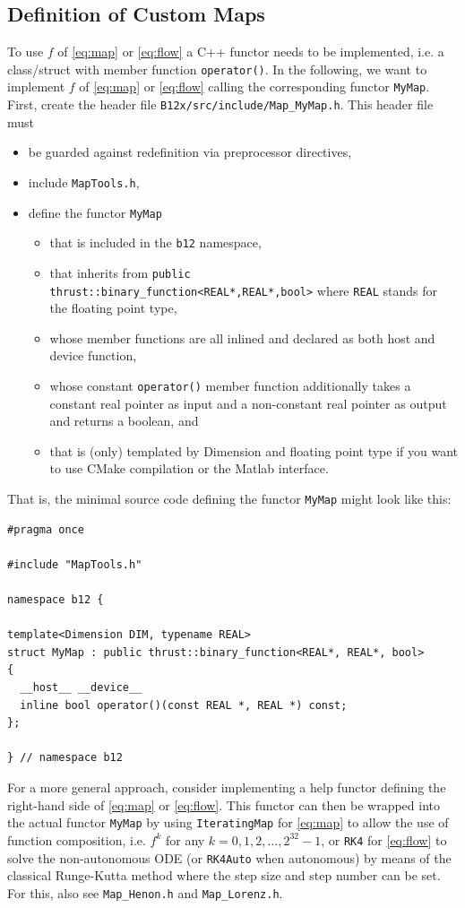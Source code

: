 \documentclass[a4paper,10pt,fleqn]{article}
\begin{document}
\subsection{Definition of Custom Maps} \label{subsec:def_custom_maps}

To use $f$ of \eqref{eq:map} or \eqref{eq:flow} a C++ functor needs to be implemented, i.e. a class/struct with member function \verb$operator()$. In the following, we want to implement $f$ of \eqref{eq:map} or \eqref{eq:flow} calling the corresponding functor \verb$MyMap$.\\
First, create the header file \verb$B12x/src/include/Map_MyMap.h$. This header file must
\begin{itemize}
\item be guarded against redefinition via preprocessor directives,
\item include \verb$MapTools.h$,
\item define the functor \verb$MyMap$
	\begin{itemize}
	\item that is included in the \verb$b12$ namespace,
	\item that inherits from \verb$public thrust::binary_function<REAL*,REAL*,bool>$ where \verb$REAL$ stands for the floating point type,
	\item whose member functions are all inlined and declared as both host and device function,
	\item whose constant \verb$operator()$ member function additionally takes a constant real pointer as input and a non-constant real pointer as output and returns a boolean, and
	\item that is (only) templated by Dimension and floating point type if you want to use CMake compilation or the Matlab interface.
	\end{itemize}
\end{itemize}
That is, the minimal source code defining the functor \verb$MyMap$ might look like this:
\begin{verbatim}
#pragma once

#include "MapTools.h"

namespace b12 {

template<Dimension DIM, typename REAL>
struct MyMap : public thrust::binary_function<REAL*, REAL*, bool>
{
  __host__ __device__
  inline bool operator()(const REAL *, REAL *) const;
};

} // namespace b12
\end{verbatim}
For a more general approach, consider implementing a help functor defining the right-hand side of \eqref{eq:map} or \eqref{eq:flow}. This functor can then be wrapped into the actual functor \verb$MyMap$ by using \verb$IteratingMap$ for \eqref{eq:map} to allow the use of function composition, i.e. $f^k$ for any $k = 0, 1, 2, \ldots, 2^{32}-1$, or \verb$RK4$ for \eqref{eq:flow} to solve the non-autonomous ODE (or \verb$RK4Auto$ when autonomous) by means of the classical Runge-Kutta method where the step size and step number can be set. For this, also see \verb$Map_Henon.h$ and \verb$Map_Lorenz.h$.\\
\end{document}
